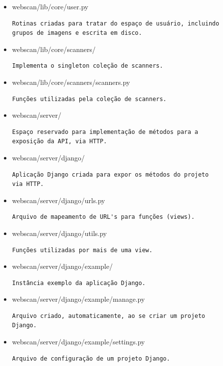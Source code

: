 \begin{itemize}
\item webscan/lib/core/user.py
\begin{verbatim}
Rotinas criadas para tratar do espaço de usuário, incluindo
grupos de imagens e escrita em disco.
\end{verbatim}

\item webscan/lib/core/scanners/
\begin{verbatim}
Implementa o singleton coleção de scanners.
\end{verbatim}

\item webscan/lib/core/scanners/scanners.py
\begin{verbatim}
Funções utilizadas pela coleção de scanners.
\end{verbatim}

\item webscan/server/
\begin{verbatim}
Espaço reservado para implementação de métodos para a 
exposição da API, via HTTP.
\end{verbatim}

\item webscan/server/django/
\begin{verbatim}
Aplicação Django criada para expor os métodos do projeto
via HTTP.
\end{verbatim}

\item webscan/server/django/urls.py
\begin{verbatim}
Arquivo de mapeamento de URL's para funções (views).
\end{verbatim}

\item webscan/server/django/utils.py
\begin{verbatim}
Funções utilizadas por mais de uma view.
\end{verbatim}

\item webscan/server/django/example/
\begin{verbatim}
Instância exemplo da aplicação Django.
\end{verbatim}

\item webscan/server/django/example/manage.py
\begin{verbatim}
Arquivo criado, automaticamente, ao se criar um projeto 
Django.
\end{verbatim}

\item webscan/server/django/example/settings.py
\begin{verbatim}
Arquivo de configuração de um projeto Django.
\end{verbatim}


\end{itemize}
